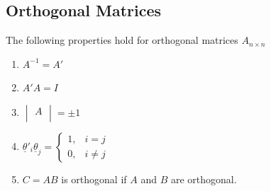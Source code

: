 \documentclass[11pt,a4paper]{article}
\theoremstyle{definition}
\begin{document}
\pagebreak





\subsection{Orthogonal Matrices}
The following properties hold for orthogonal matrices $A_{n\times n}$
\begin{enumerate}
\item $\displaystyle{A^{-1} = A'}$

\item $\displaystyle{A'A = I}$

\item $\displaystyle{
\begin{vmatrix}
A\\
\end{vmatrix}
= \pm 1
}$\\

\item $\displaystyle{
\underline{\theta}'_i\underline{\theta}_j = \begin{cases}
1, & i=j\\
0, & i\neq j
\end{cases}
}$

\item $C=AB$ is orthogonal if $A$ and $B$ are orthogonal.\\\\
\end{enumerate}
\end{document}
